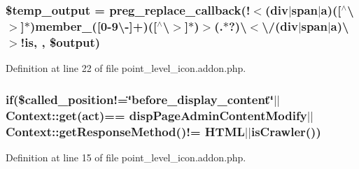 \subsubsection[{\texorpdfstring{\$temp\+\_\+output}{$temp_output}}]{\setlength{\rightskip}{0pt plus 5cm}\$temp\+\_\+output = preg\+\_\+replace\+\_\+callback(\textquotesingle{}!$<$(div$\vert$span$\vert${\bf a})(\mbox{[}$^\wedge$\textbackslash{}$>$\mbox{]}$\ast$)member\+\_\+(\mbox{[}0-\/9\textbackslash{}-\/\mbox{]}+)(\mbox{[}$^\wedge$\textbackslash{}$>$\mbox{]}$\ast$)$>$(.$\ast$?)\textbackslash{}$<$\textbackslash{}/(div$\vert$span$\vert${\bf a})\textbackslash{}$>$!is\textquotesingle{}, \textquotesingle{}, \$output)}\hypertarget{point__level__icon_8addon_8php_a5866ef6f77cbeaf87d8208cf805bbc3d}{}\label{point__level__icon_8addon_8php_a5866ef6f77cbeaf87d8208cf805bbc3d}


Definition at line 22 of file point\+\_\+level\+\_\+icon.\+addon.\+php.

\subsubsection[{\texorpdfstring{if}{if}}]{\setlength{\rightskip}{0pt plus 5cm}if(\$called\+\_\+position!=\char`\"{}before\+\_\+display\+\_\+content\char`\"{}$\vert$$\vert$Context\+::get(\textquotesingle{}act\textquotesingle{})== \textquotesingle{}disp\+Page\+Admin\+Content\+Modify\textquotesingle{}$\vert$$\vert${\bf Context\+::get\+Response\+Method}()!= \textquotesingle{}H\+T\+ML\textquotesingle{}$\vert$$\vert${\bf is\+Crawler}())}\hypertarget{point__level__icon_8addon_8php_a29031816e50a8f742422e671b2bef9b2}{}\label{point__level__icon_8addon_8php_a29031816e50a8f742422e671b2bef9b2}


Definition at line 15 of file point\+\_\+level\+\_\+icon.\+addon.\+php.

